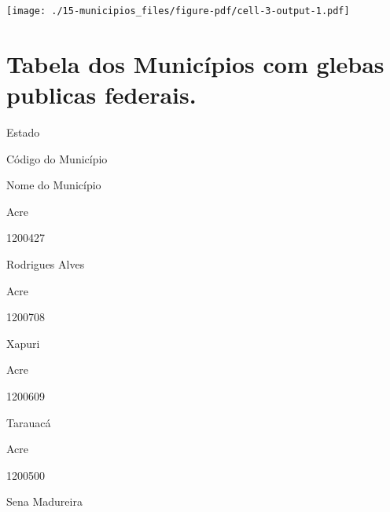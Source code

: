 \documentclass[
  letterpaper,
]{report}
\begin{document}
\texttt{[image: ./15-municipios\_files/figure-pdf/cell-3-output-1.pdf]}

\hypertarget{tabela-dos-municuxedpios-com-glebas-publicas-federais.}{%
\section{Tabela dos Municípios com glebas publicas
federais.}\label{tabela-dos-municuxedpios-com-glebas-publicas-federais.}}

\n  

\n    

\n      

Estado

\n      

Código do Município

\n      

Nome do Município

\n    

\n  

\n  

\n    

\n      

Acre

\n      

1200427

\n      

Rodrigues Alves

\n    

\n    

\n      

Acre

\n      

1200708

\n      

Xapuri

\n    

\n    

\n      

Acre

\n      

1200609

\n      

Tarauacá

\n    

\n    

\n      

Acre

\n      

1200500

\n      

Sena Madureira

\n    
\end{document}
